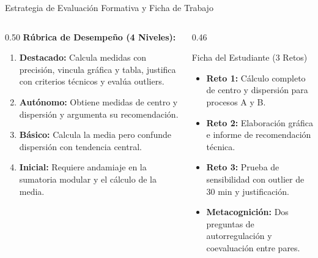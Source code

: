 \documentclass[
	spanish,
	aspectratio=169,
	xcolor={dvipsnames,table}
]{beamer}
\begin{document}
\begin{frame}{Estrategia de Evaluación Formativa y Ficha de Trabajo}
\small
\begin{columns}[T]
	\begin{column}{0.50\textwidth}
		\textbf{Rúbrica de Desempeño (4 Niveles):}
		\begin{enumerate}\setlength{\itemsep}{0.1cm}
			\item \textbf{Destacado:} Calcula medidas con precisión, vincula gráfica y tabla, justifica con criterios técnicos y evalúa outliers.
			\item \textbf{Autónomo:} Obtiene medidas de centro y dispersión y argumenta su recomendación.
			\item \textbf{Básico:} Calcula la media pero confunde dispersión con tendencia central.
			\item \textbf{Inicial:} Requiere andamiaje en la sumatoria modular y el cálculo de la media.
		\end{enumerate}
	\end{column}
	\begin{column}{0.46\textwidth}
		\begin{block}{Ficha del Estudiante (3 Retos)}
			\begin{itemize}\setlength{\itemsep}{0.1cm}
				\item \textbf{Reto 1:} Cálculo completo de centro y dispersión para procesos A y B.
				\item \textbf{Reto 2:} Elaboración gráfica e informe de recomendación técnica.
				\item \textbf{Reto 3:} Prueba de sensibilidad con outlier de 30 min y justificación.
				\item \textbf{Metacognición:} Dos preguntas de autorregulación y coevaluación entre pares.
			\end{itemize}
		\end{block}
	\end{column}
\end{columns}
\end{frame}
\end{document}
